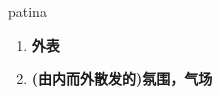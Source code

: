 
\begin{frame}
{\huge patina}
\begin{center}
\begin{enumerate}\Large
  \item \textbf{外表}
  \item \textbf{(由内而外散发的)氛围，气场}
\end{enumerate}
\end{center}
\end{frame}
